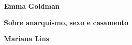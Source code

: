 \textbf{Emma Goldman} \lipsum[1]

\textbf{Sobre anarquismo, sexo e casamento} \lipsum[3]

\textbf{Mariana Lins} \lipsum[4]

